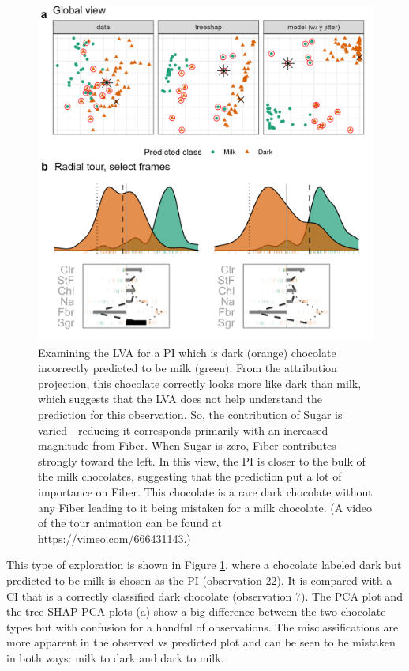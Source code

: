\documentclass[
]{article}
\begin{document}
\begin{figure}

{\centering \includegraphics[width=1\linewidth]{./figures/case_chocolates} 

}

\caption{Examining the LVA for a PI which is dark (orange) chocolate incorrectly predicted to be milk (green). From the attribution projection, this chocolate correctly looks more like dark than milk, which suggests that the LVA does not help understand the prediction for this observation. So, the contribution of Sugar is varied---reducing it corresponds primarily with an increased magnitude from Fiber. When Sugar is zero, Fiber contributes strongly toward the left. In this view, the PI is closer to the bulk of the milk chocolates, suggesting that the prediction put a lot of importance on Fiber. This chocolate is a rare dark chocolate without any Fiber leading to it being mistaken for a milk chocolate. (A video of the tour animation can be found at https://vimeo.com/666431143.)}\label{fig:casechocolates}
\end{figure}

This type of exploration is shown in Figure \ref{fig:casechocolates}, where a chocolate labeled dark but predicted to be milk is chosen as the PI (observation 22). It is compared with a CI that is a correctly classified dark chocolate (observation 7). The PCA plot and the tree SHAP PCA plots (a) show a big difference between the two chocolate types but with confusion for a handful of observations. The misclassifications are more apparent in the observed vs predicted plot and can be seen to be mistaken in both ways: milk to dark and dark to milk.
\end{document}
